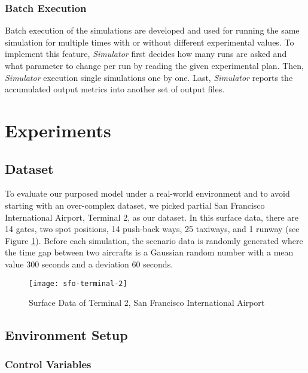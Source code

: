 \documentclass[letterpaper, 10 pt, conference]{ieeeconf}
\begin{document}
\subsubsection{Batch Execution}

Batch execution of the simulations are developed and used for running the same simulation for multiple times with or without different experimental values. To implement this feature, {\it Simulator} first decides how many runs are asked and what parameter to change per run by reading the given experimental plan. Then, {\it Simulator} execution single simulations one by one. Last, {\it Simulator} reports the accumulated output metrics into another set of output files.

\section{Experiments}

\subsection{Dataset}

To evaluate our purposed model under a real-world environment and to avoid starting with an over-complex dataset, we picked partial San Francisco International Airport, Terminal 2, as our dataset. In this surface data, there are 14 gates, two spot positions, 14 push-back ways, 25 taxiways, and 1 runway (see Figure \ref{sfo-terminal-2}). Before each simulation, the scenario data is randomly generated where the time gap between two aircrafts is a Gaussian random number with a mean value 300 seconds and a deviation 60 seconds.


\begin{figure}[h]
\caption{Surface Data of Terminal 2, San Francisco International Airport}
\centering
\texttt{[image: sfo-terminal-2]}
\label{sfo-terminal-2}
\end{figure}

\subsection{Environment Setup}

\subsubsection{Control Variables}
\end{document}
